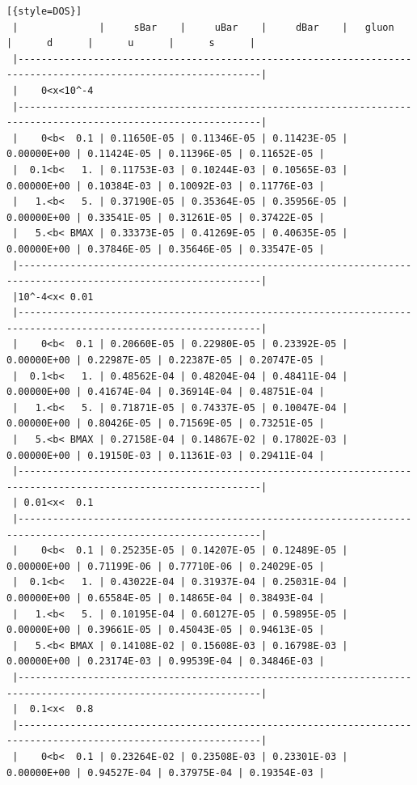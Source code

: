 \documentclass[prd,nofootinbib,eqsecnum,final]{revtex4}
\renewcommand{\(}{\left(}
\renewcommand{\)}{\right)}
\renewcommand{\[}{\left[}
\renewcommand{\]}{\right]}
\begin{document}
\begin{lstlisting}[{style=DOS}]
 |              |     sBar    |     uBar    |     dBar    |   gluon     |      d      |      u      |      s      |
 |----------------------------------------------------------------------------------------------------------------|
 |    0<x<10^-4
 |----------------------------------------------------------------------------------------------------------------|
 |    0<b<  0.1 | 0.11650E-05 | 0.11346E-05 | 0.11423E-05 | 0.00000E+00 | 0.11424E-05 | 0.11396E-05 | 0.11652E-05 |
 |  0.1<b<   1. | 0.11753E-03 | 0.10244E-03 | 0.10565E-03 | 0.00000E+00 | 0.10384E-03 | 0.10092E-03 | 0.11776E-03 |
 |   1.<b<   5. | 0.37190E-05 | 0.35364E-05 | 0.35956E-05 | 0.00000E+00 | 0.33541E-05 | 0.31261E-05 | 0.37422E-05 |
 |   5.<b< BMAX | 0.33373E-05 | 0.41269E-05 | 0.40635E-05 | 0.00000E+00 | 0.37846E-05 | 0.35646E-05 | 0.33547E-05 |
 |----------------------------------------------------------------------------------------------------------------|
 |10^-4<x< 0.01
 |----------------------------------------------------------------------------------------------------------------|
 |    0<b<  0.1 | 0.20660E-05 | 0.22980E-05 | 0.23392E-05 | 0.00000E+00 | 0.22987E-05 | 0.22387E-05 | 0.20747E-05 |
 |  0.1<b<   1. | 0.48562E-04 | 0.48204E-04 | 0.48411E-04 | 0.00000E+00 | 0.41674E-04 | 0.36914E-04 | 0.48751E-04 |
 |   1.<b<   5. | 0.71871E-05 | 0.74337E-05 | 0.10047E-04 | 0.00000E+00 | 0.80426E-05 | 0.71569E-05 | 0.73251E-05 |
 |   5.<b< BMAX | 0.27158E-04 | 0.14867E-02 | 0.17802E-03 | 0.00000E+00 | 0.19150E-03 | 0.11361E-03 | 0.29411E-04 |
 |----------------------------------------------------------------------------------------------------------------|
 | 0.01<x<  0.1
 |----------------------------------------------------------------------------------------------------------------|
 |    0<b<  0.1 | 0.25235E-05 | 0.14207E-05 | 0.12489E-05 | 0.00000E+00 | 0.71199E-06 | 0.77710E-06 | 0.24029E-05 |
 |  0.1<b<   1. | 0.43022E-04 | 0.31937E-04 | 0.25031E-04 | 0.00000E+00 | 0.65584E-05 | 0.14865E-04 | 0.38493E-04 |
 |   1.<b<   5. | 0.10195E-04 | 0.60127E-05 | 0.59895E-05 | 0.00000E+00 | 0.39661E-05 | 0.45043E-05 | 0.94613E-05 |
 |   5.<b< BMAX | 0.14108E-02 | 0.15608E-03 | 0.16798E-03 | 0.00000E+00 | 0.23174E-03 | 0.99539E-04 | 0.34846E-03 |
 |----------------------------------------------------------------------------------------------------------------|
 |  0.1<x<  0.8
 |----------------------------------------------------------------------------------------------------------------|
 |    0<b<  0.1 | 0.23264E-02 | 0.23508E-03 | 0.23301E-03 | 0.00000E+00 | 0.94527E-04 | 0.37975E-04 | 0.19354E-03 |

\end{lstlisting}
\end{document}
